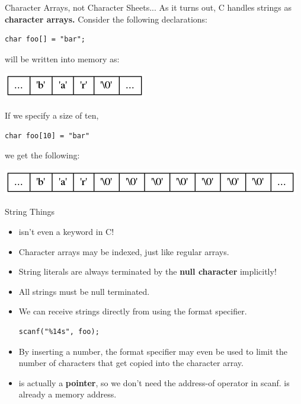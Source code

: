 \documentclass[11pt]{beamer}
\let\OldTexttt\texttt
\renewcommand{\texttt}[1]{\OldTexttt{\color{teal}{#1}}}
\begin{document}
\begin{frame}[fragile=singleslide]{Character Arrays, not Character Sheets...}
As it turns out, C handles strings as \textbf{character arrays.} Consider the following declarations:
\begin{lstlisting}[style=C]
char foo[] = "bar";
\end{lstlisting}
\texttt{foo} will be written into memory as:
\begin{center}
\includegraphics[scale=0.5]{string.png}
\end{center}
If we specify a size of ten,
\begin{lstlisting}[style=C]
char foo[10] = "bar"
\end{lstlisting}
 we get the following:
 \begin{center}
 \includegraphics[scale=0.5]{string2.png}
 \end{center}

\end{frame}

\begin{frame}[fragile=singleslide]{String Things}
\begin{itemize}
\item \texttt{string} isn't even a keyword in C! 
\item Character arrays may be indexed, just like regular arrays.
\item String literals are always terminated by the \textbf{null character} implicitly!
\item All strings must be null terminated.
\item We can receive strings directly from \texttt{scanf} using the\texttt{\%s} format specifier.
\begin{lstlisting}[style=C]
scanf("%14s", foo);
\end{lstlisting}
\item By inserting a number, the format specifier may even be used to limit the number of characters that get copied into the character array.  
\item \texttt{foo} is actually a \textbf{pointer}, so we don't need the address-of operator \texttt{\&} in scanf. \texttt{foo} is already a memory address.
\end{itemize}
\end{frame}
\end{document}
